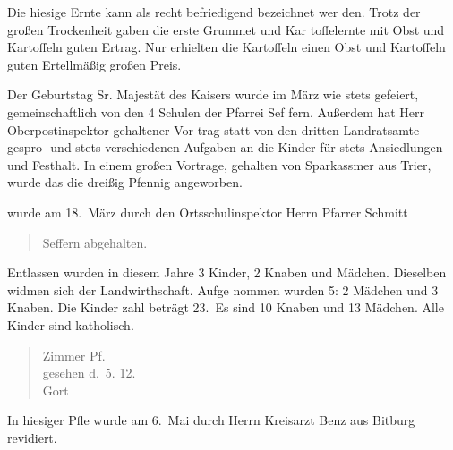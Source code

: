 

\pstart
Die hiesige Ernte kann als recht befriedigend bezeichnet wer\ohb
den. Trotz der großen Trockenheit gaben die erste Grummet und Kar\ohb
toffelernte mit Obst und Kartoffeln guten Ertrag. Nur erhielten die\ob
Kartoffeln einen Obst und Kartoffeln guten Ertellmäßig\unsicher\ob
großen Preis.

\pend
{}
\pstart

Der Geburtstag Sr. Majestät des Kaisers wurde im März wie stets\ob
gefeiert, gemeinschaftlich von den 4 Schulen der Pfarrei Sef\ohb
fern. Außerdem hat Herr Oberpostinspektor\unsicher{} gehaltener Vor\ohb
trag statt von den dritten\unsicher{} Landratsamte gespro-\unsicher\ob
und stets verschiedenen\unsicher{} Aufgaben an die Kinder für stets\ob
Ansiedlungen und Festhalt. In einem großen Vortrage,\ob
gehalten von Sparkassmer\unsicher{} aus Trier, wurde das die\unsicher{} dreißig\ob
Pfennig angeworben.

\pend
{}
\pstart

wurde am 18.\ März durch den Ortsschulinspektor Herrn Pfarrer Schmitt

\pend
\begin{verse}
Seffern abgehalten.
\end{verse}
\pstart

\pend
{}
\pstart

Entlassen wurden in diesem Jahre 3 Kinder, 2 Knaben und Mädchen. Dieselben widmen sich der Landwirthschaft. Aufge\ohb
nommen wurden 5: 2 Mädchen und 3 Knaben. Die Kinder\ohb
zahl beträgt 23.\ Es sind 10 Knaben und 13 Mädchen.\ob
Alle Kinder sind katholisch.

\pend
{}
\pstart


\pend
\begin{verse}
Zimmer Pf.\\
gesehen d.\ 5. 12.\\
Gort\unsicher
\end{verse}
\pstart

\pend
{}
\pstart

In hiesiger Pfle\unsicher{} wurde am 6.\ Mai durch Herrn Kreisarzt\unsicher\ob
Benz\unsicher{} aus Bitburg revidiert\unsicher.
\pend
